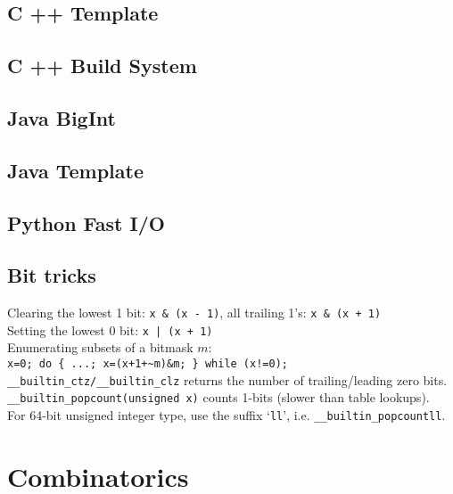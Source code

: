 \documentclass[12pt]{extarticle}
\begin{document}
\begin{multicols*}{2}
\subsection{C ++ Template} %


\subsection{C ++ Build System} %


\subsection{Java BigInt} %


\subsection{Java Template} %


\subsection{Python Fast I/O} %



\subsection{Bit tricks}
Clearing the lowest 1 bit: \verb$x & (x - 1)$, all trailing 1's: \verb$x & (x + 1)$ \\
Setting the lowest 0 bit: \verb$x | (x + 1)$ \\
Enumerating subsets of a bitmask $m$: \\
\verb|x=0; do { ...; x=(x+1+~m)&m; } while (x!=0);| \\
\verb$__builtin_ctz/__builtin_clz$ returns the number of trailing/leading zero bits. \\
\verb$__builtin_popcount(unsigned x)$ counts 1-bits (slower than table lookups). \\
For 64-bit unsigned integer type, use the suffix `\verb$ll$', i.e. \verb$__builtin_popcountll$.



\section{Combinatorics}


\end{multicols*}
\end{document}
